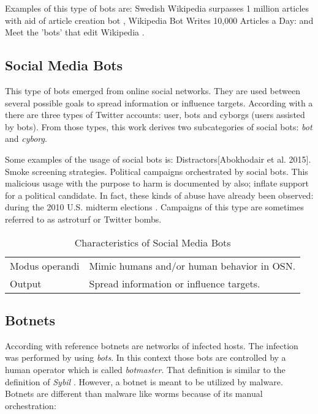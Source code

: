 \documentclass[runningheads,a4paper]{llncs}
\begin{document}
        
    Examples of this type of bots are:
    Swedish Wikipedia surpasses 1 million articles with aid of article creation bot \cite{guld:2013}, Wikipedia Bot Writes 10,000 Articles
    a Day: \cite{wikiWriter:2014} and Meet the 'bots' that edit Wikipedia \cite{bbc07:2012}.
    

\subsection{Social Media Bots}
    This type of bots emerged from online social networks. They are used between several possible goals to spread information or influence
    targets. According with\cite{wagner2012social} a there are three types of Twitter accounts: user, bots and cyborgs (users assisted by bots). 
    From those types, this work derives two subcategories of social bots: \emph{bot} and \emph{cyborg}.
    
    Some examples of the usage of social bots is: Distractors[Abokhodair et al. 2015]. Smoke screening strategies. Political campaigns 
    orchestrated by social bots\cite{ratkiewicz2011detecting}. This malicious usage with the purpose to harm is documented by \cite{ferrara:2015} also; 
    inflate support for a political candidate. In fact, these kinds of abuse have already been observed: during the 2010 U.S. midterm elections 
    \cite{ratkiewicz2011detecting}. Campaigns of this type are sometimes referred to as astroturf or Twitter bombs\cite{ferrara:2015}.
    
    \begin{table}
        \caption{Characteristics of Social Media Bots}
        \begin{tabular}{p{3cm} p{9cm}}
        \hline
        Modus operandi &  Mimic humans and/or human behavior in OSN. \\ 
        Output                &  Spread information or influence targets. \\
        \hline
        \end{tabular}
        \label{tab:socialb}
    \end{table}
    
    
\subsection{Botnets}
    According with reference\cite{abu:2006} botnets are networks of infected hosts. The infection was performed by using \emph{bots}. In this context those bots are controlled by a human
    operator which is called \emph{botmaster}. That definition is similar to the definition of \emph{Sybil} \cite{ferrara:2015}. However, a botnet
    is meant to be utilized by malware. Botnets are different than malware like worms because of its manual orchestration\cite{abu:2006}:
    
\end{document}
